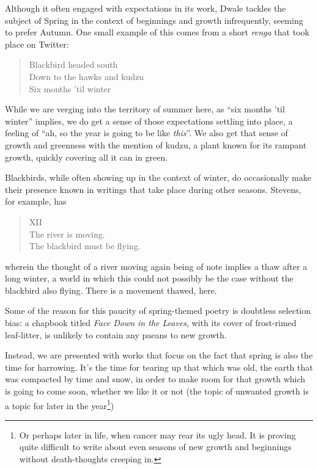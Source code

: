 \documentclass[12pt,oneside]{memoir}
\begin{document}
Although it often engaged with expectations in its work, Dwale tackles the subject of Spring in the context of beginnings and growth infrequently, seeming to prefer Autumn. One small example of this comes from a short \emph{renga} that took place on Twitter:

\begin{verse}
Blackbird headed south\\
Down to the hawks and kudzu\\
Six months 'til winter

\parencite{dwale_haiku}
\end{verse}

While we are verging into the territory of summer here, as ``six months 'til winter'' implies, we do get a sense of those expectations settling into place, a feeling of ``ah, so the year is going to be like \emph{this}''. We also get that sense of growth and greenness with the mention of kudzu, a plant known for its rampant growth, quickly covering all it can in green.

Blackbirds, while often showing up in the context of winter, do occasionally make their presence known in writings that take place during other seasons. Stevens, for example, has

\begin{verse}
XII \\
The river is moving. \\
The blackbird must be flying.

\parencite{blackbird}
\end{verse}
wherein the thought of a river moving again being of note implies a thaw after a long winter, a world in which this could not possibly be the case without the blackbird also flying. There is a movement thawed, here.

Some of the reason for this paucity of spring-themed poetry is doubtless selection bias: a chapbook titled \emph{Face Down in the Leaves}, with its cover of frost-rimed leaf-litter, is unlikely to contain any paeans to new growth.

Instead, we are presented with works that focus on the fact that spring is also the time for harrowing. It's the time for tearing up that which was old, the earth that was compacted by time and snow, in order to make room for that growth which is going to come soon, whether we like it or not (the topic of unwanted growth is a topic for later in the year\footnote{Or perhaps later in life, when cancer may rear its ugly head. It is proving quite difficult to write about even seasons of new growth and beginnings without death-thoughts creeping in.})
\end{document}
